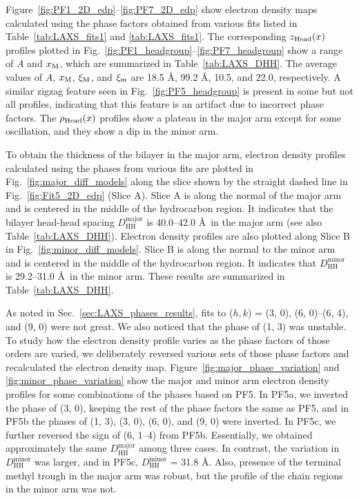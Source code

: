 Figure~\ref{fig:PF1_2D_edp}--\ref{fig:PF7_2D_edp} show electron density maps
calculated using the phase factors obtained from various fits listed in
Table~\ref{tab:LAXS_fits1} and \ref{tab:LAXS_fits1}. 
The corresponding $z_\text{Head}(x)$ profiles plotted in 
Fig.~\ref{fig:PF1_headgroup}--\ref{fig:PF7_headgroup} show a range of $A$ and $x_\textrm{M}$,
which are summarized in Table~\ref{tab:LAXS_DHH}.
The average values of $A$, $x_\textrm{M}$, $\xi_\text{M}$, and $\xi_\text{m}$ are 
18.5 \AA, 99.2 \AA, 10.5\textdegree, and 22.0\textdegree, respectively.
A similar zigzag feature seen in Fig.~\ref{fig:PF5_headgroup} is present
in some but not all profiles, indicating that this feature is an artifact 
due to incorrect phase factors.
The $\rho_\text{Head}(x)$ profiles show a plateau in the major arm except for some
oscillation, and they show a dip in the minor arm.

To obtain the thickness of the bilayer in the major arm, 
electron density profiles calculated
using the phases from various fits are 
plotted in Fig.~\ref{fig:major_diff_models} 
along the slice shown by the straight dashed line in Fig.~\ref{fig:Fit5_2D_edp}
(Slice A).
Slice A is along the normal of the major arm and is centered in the middle of 
the hydrocarbon region. It indicates that the bilayer head-head spacing 
$D_\text{HH}^\text{major}$ is 40.0--42.0 \AA\ in the major arm
(see also Table~\ref{tab:LAXS_DHH}). 
Electron density profiles are also plotted along Slice B
in Fig.~\ref{fig:minor_diff_models}.
Slice B is
along the normal to the minor arm and is centered in the middle of the
hydrocarbon region. It indicates that $D_\text{HH}^\text{minor}$ is
29.2--31.0 \AA\ in the minor arm.
These results are summarized in Table~\ref{tab:LAXS_DHH}.

As noted in Sec.~\ref{sec:LAXS_phases_results}, fits to ($h, k$) = (3, 0), (6, 0)--(6, 4),
and (9, 0) were not great. We also noticed that the phase of (1, 3) was unstable. 
To study how the electron density profile varies as the phase factors of those orders are varied,
we deliberately reversed various sets of those phase factors and recalculated the electron 
density map. Figure~\ref{fig:major_phase_variation}
and \ref{fig:minor_phase_variation} show the major and minor arm electron density
profiles for some combinations of the phases based on PF5. 
In PF5a, we inverted the phase of (3, 0), 
keeping the rest of the phase factors the same as PF5,
and in PF5b the phases of 
(1, 3), (3, 0), (6, 0), and (9, 0) were inverted.
In PF5c, we further reversed the sign of (6, 1--4) from PF5b.
Essentially, we obtained approximately the same $D_\text{HH}^\text{major}$
among three cases. In contrast, the variation in $D_\text{HH}^\text{minor}$ was
larger, and in PF5c, $D_\text{HH}^\text{minor}$ = 31.8 \AA.
Also, presence of the terminal methyl trough in the major arm was robust, but
the profile of the chain regions in the minor arm was not.

